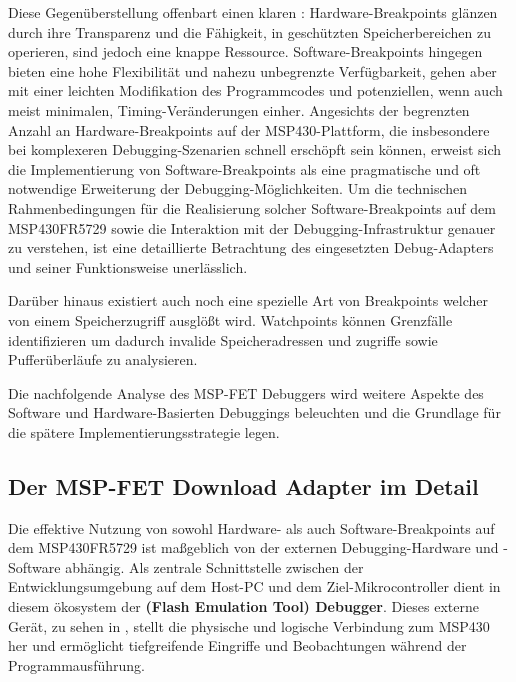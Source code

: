 Diese Gegen\"uberstellung offenbart einen klaren : Hardware-Breakpoints gl\"anzen durch ihre Transparenz und die F\"ahigkeit, in gesch\"utzten Speicherbereichen zu operieren, sind jedoch eine knappe Ressource. Software-Breakpoints hingegen bieten eine hohe Flexibilit\"at und nahezu unbegrenzte Verf\"ugbarkeit, gehen aber mit einer leichten Modifikation des Programmcodes und potenziellen, wenn auch meist minimalen, Timing-Ver\"anderungen einher. Angesichts der begrenzten Anzahl an Hardware-Breakpoints auf der MSP430-Plattform, die insbesondere bei komplexeren Debugging-Szenarien schnell ersch\"opft sein k\"onnen, erweist sich die Implementierung von Software-Breakpoints als eine pragmatische und oft notwendige Erweiterung der Debugging-M\"oglichkeiten. Um die technischen Rahmenbedingungen f\"ur die Realisierung solcher Software-Breakpoints auf dem MSP430FR5729 sowie die Interaktion mit der Debugging-Infrastruktur genauer zu verstehen, ist eine detaillierte Betrachtung des eingesetzten Debug-Adapters und seiner Funktionsweise unerl\"asslich. 

Dar\"uber hinaus existiert auch noch eine spezielle Art von Breakpoints welcher von einem Speicherzugriff ausgl\"o{\ss}t wird. Watchpoints k\"onnen Grenzf\"alle identifizieren um dadurch invalide Speicheradressen und zugriffe sowie Puffer\"uberl\"aufe zu analysieren. 

Die nachfolgende Analyse des MSP-FET Debuggers wird weitere Aspekte des Software und Hardware-Basierten Debuggings beleuchten und die Grundlage f\"ur die sp\"atere Implementierungsstrategie legen.\AI

\subsection{Der MSP-FET Download Adapter im Detail}
\label{sec:MSP-FET_Debugger}

Die effektive Nutzung von sowohl Hardware- als auch Software-Breakpoints auf dem MSP430FR5729 ist ma{\ss}geblich von der externen Debugging-Hardware und -Software abh\"angig. Als zentrale Schnittstelle zwischen der Entwicklungsumgebung auf dem Host-PC und dem Ziel-Mikrocontroller dient in diesem \"okosystem der \textbf{ (Flash Emulation Tool) Debugger}. Dieses externe Ger\"at, zu sehen in , stellt die physische und logische Verbindung zum MSP430 her und erm\"oglicht tiefgreifende Eingriffe und Beobachtungen w\"ahrend der Programmausf\"uhrung.

